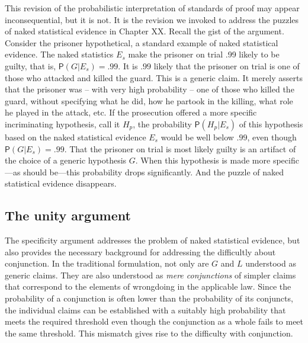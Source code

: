 \documentclass[
  10pt,
  dvipsnames,enabledeprecatedfontcommands]{scrartcl}
\newcommand{\pr}[1]{\ensuremath{\mathsf{P}(#1)}}
\begin{document}
This revision of the probabilistic interpretation of standards of proof
may appear inconsequential, but it is not. It is the revision we invoked
to address the puzzles of naked statistical evidence in Chapter XX.
 Recall the gist of the argument.
Consider the prisoner hypothetical, a standard example of naked
statistical evidence. The naked statistics \(E_s\) make the prisoner on
trial .99 likely to be guilty, that is, \(\pr{G \vert E_s} =.99\). It is
\(.99\) likely that the prisoner on trial is one of those who attacked
and killed the guard. This is a generic claim. It merely asserts that
the prisoner was -- with very high probability -- one of those who
killed the guard, without specifying what he did, how he partook in the
killing, what role he played in the attack, etc. If the prosecution
offered a more specific incriminating hypothesis, call it \(H_p\), the
probability \(\pr{H_p \vert E_{s}}\) of this hypothesis based on the
naked statistical evidence \(E_s\) would be well below \(.99\), even
though \(\pr{G \vert E_s}=.99\). That the prisoner on trial is most
likely guilty is an artifact of the choice of a generic hypothesis
\(G\). When this hypothesis is made more specific---as should be---this
probability drops significantly. And the puzzle of naked statistical
evidence disappears.

\hypertarget{the-unity-argument}{%
\subsection{The unity argument}\label{the-unity-argument}}

The specificity argument addresses the problem of naked statistical
evidence, but also provides the necessary background for addressing the
difficultly about conjunction. In the traditional formulation, not only
are \(G\) and \(L\) understood as generic claims. They are also
understood as \emph{mere conjunctions} of simpler claims that correspond
to the elements of wrongdoing in the applicable law. Since the
probability of a conjunction is often lower than the probability of its
conjuncts, the individual claims can be established with a suitably high
probability that meets the required threshold even though the
conjunction as a whole fails to meet the same threshold. This mismatch
gives rise to the difficulty with conjunction.
\end{document}
